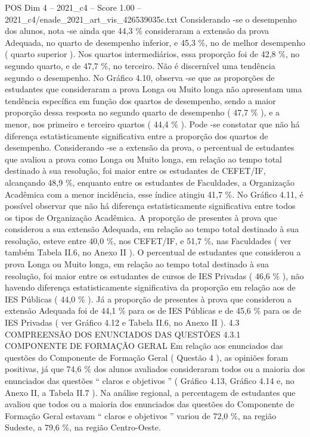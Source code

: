 \begin{textsample}{POS Dim 4 – 2021\_c4 – Score 1.00 – 2021\_c4/enade\_2021\_art\_vis\_426539035c.txt}
Considerando -se o desempenho dos alunos, nota -se ainda que 44,3 \% consideraram a extensão da prova Adequada, no quarto de desempenho inferior, e 45,3 \%, no de melhor desempenho ( quarto superior ).
Nos quartos intermediários, essa proporção foi de 42,8 \%, no segundo quarto, e de 47,7 \%, no terceiro.
Não é discernível uma tendência segundo o desempenho.
No Gráfico 4.10, observa -se que as proporções de estudantes que consideraram a prova Longa ou Muito longa não apresentam uma tendência específica em função dos quartos de desempenho, sendo a maior proporção dessa resposta no segundo quarto de desempenho ( 47,7 \% ), e a menor, nos primeiro e terceiro quartos ( 44,4 \% ).
Pode -se constatar que não há diferença estatisticamente significativa entre a proporção dos quartos de desempenho.
Considerando -se a extensão da prova, o percentual de estudantes que avaliou a prova como Longa ou Muito longa, em relação ao tempo total destinado à sua resolução, foi maior entre os estudantes de CEFET/IF, alcançando 48,9 \%, enquanto entre os estudantes de Faculdades, a Organização Acadêmica com a menor incidência, esse índice atingiu 41,7 \%.
No Gráfico 4.11, é possível observar que não há diferença estatisticamente significativa entre todos os tipos de Organização Acadêmica.
A proporção de presentes à prova que considerou a sua extensão Adequada, em relação ao tempo total destinado à sua resolução, esteve entre 40,0 \%, nos CEFET/IF, e 51,7 \%, nas Faculdades ( ver também Tabela II.6, no Anexo II ).
O percentual de estudantes que considerou a prova Longa ou Muito longa, em relação ao tempo total destinado à sua resolução, foi maior entre os estudantes de cursos de IES Privadas ( 46,6 \% ), não havendo diferença estatisticamente significativa da proporção em relação aos de IES Públicas ( 44,0 \% ).
Já a proporção de presentes à prova que considerou a extensão Adequada foi de 44,1 \% para os de IES Públicas e de 45,6 \% para os de IES Privadas ( ver Gráfico 4.12 e Tabela II.6, no Anexo II ). 4.3 COMPREENSÃO DOS ENUNCIADOS DAS QUESTÕES 4.3.1 COMPONENTE DE FORMAÇÃO GERAL Em relação aos enunciados das questões do Componente de Formação Geral ( Questão 4 ), as opiniões foram positivas, já que 74,6 \% dos alunos avaliados consideraram todos ou a maioria dos enunciados das questões “ claros e objetivos ” ( Gráfico 4.13, Gráfico 4.14 e, no Anexo II, a Tabela II.7 ).
Na análise regional, a percentagem de estudantes que avaliou que todos ou a maioria dos enunciados das questões do Componente de Formação Geral estavam “ claros e objetivos ” variou de 72,0 \%, na região Sudeste, a 79,6 \%, na região Centro-Oeste.

\end{textsample}
